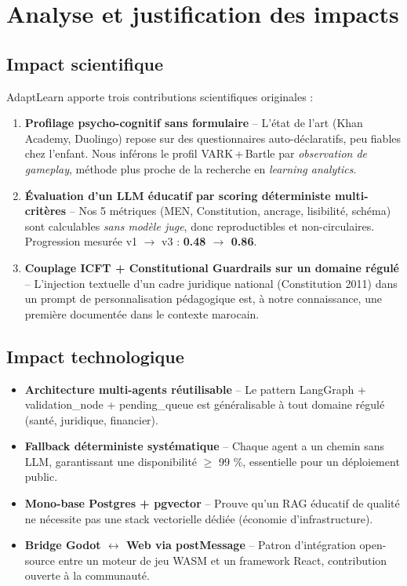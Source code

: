 \documentclass[11pt,a4paper]{article}
\begin{document}
\newpage

\section{Analyse et justification des impacts}

\subsection{Impact scientifique}

AdaptLearn apporte trois contributions scientifiques originales :

\begin{enumerate}
\item \textbf{Profilage psycho-cognitif sans formulaire} -- L'état de l'art
(Khan Academy, Duolingo) repose sur des questionnaires auto-déclaratifs, peu fiables
chez l'enfant. Nous inférons le profil VARK\,+\,Bartle par \emph{observation de gameplay},
méthode plus proche de la recherche en \textit{learning analytics}.
\item \textbf{Évaluation d'un LLM éducatif par scoring déterministe multi-critères} --
Nos 5 métriques (MEN, Constitution, ancrage, lisibilité, schéma) sont calculables
\emph{sans modèle juge}, donc reproductibles et non-circulaires. Progression mesurée
v1 $\rightarrow$ v3 : \textbf{0.48 $\rightarrow$ 0.86}.
\item \textbf{Couplage ICFT + Constitutional Guardrails sur un domaine régulé} --
L'injection textuelle d'un cadre juridique national (Constitution 2011) dans un prompt
de personnalisation pédagogique est, à notre connaissance, une première
documentée dans le contexte marocain.
\end{enumerate}

\subsection{Impact technologique}

\begin{itemize}
\item \textbf{Architecture multi-agents réutilisable} -- Le pattern LangGraph
+ validation\_node + pending\_queue est généralisable à tout domaine régulé (santé,
juridique, financier).
\item \textbf{Fallback déterministe systématique} -- Chaque agent a un chemin sans LLM,
garantissant une disponibilité $\geq$ 99 \%, essentielle pour un déploiement public.
\item \textbf{Mono-base Postgres + pgvector} -- Prouve qu'un RAG éducatif de qualité
ne nécessite pas une stack vectorielle dédiée (économie d'infrastructure).
\item \textbf{Bridge Godot $\leftrightarrow$ Web via postMessage} -- Patron
d'intégration open-source entre un moteur de jeu WASM et un framework React,
contribution ouverte à la communauté.
\end{itemize}
\end{document}
